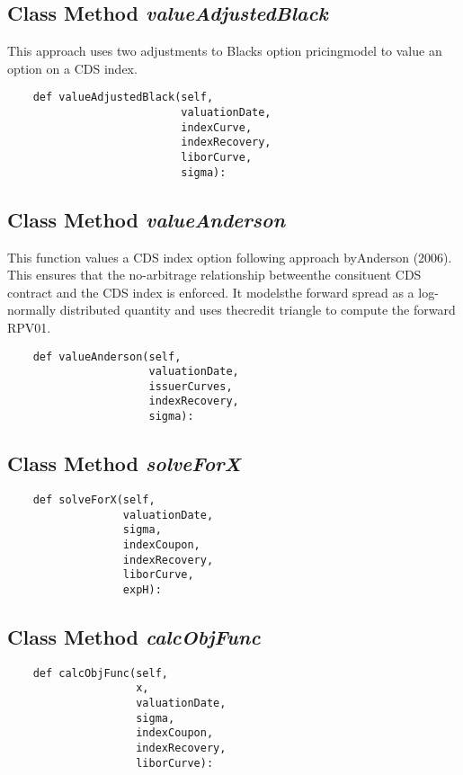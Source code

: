 \documentclass[twoside,11pt]{book}
\begin{document}
\subsection{Class Method {\it valueAdjustedBlack}}
This approach uses two adjustments to Blacks option pricingmodel to value an option on a CDS index. 

\begin{lstlisting}
    def valueAdjustedBlack(self,
                           valuationDate,
                           indexCurve,
                           indexRecovery,
                           liborCurve,
                           sigma):
\end{lstlisting}

\subsection{Class Method {\it valueAnderson}}
This function values a CDS index option following approach byAnderson (2006). This ensures that the no-arbitrage relationship betweenthe consituent CDS contract and the CDS index is enforced. It modelsthe forward spread as a log-normally distributed quantity and uses thecredit triangle to compute the forward RPV01. 

\begin{lstlisting}
    def valueAnderson(self,
                      valuationDate,
                      issuerCurves,
                      indexRecovery,
                      sigma):
\end{lstlisting}

\subsection{Class Method {\it solveForX}}


\begin{lstlisting}
    def solveForX(self,
                  valuationDate,
                  sigma,
                  indexCoupon,
                  indexRecovery,
                  liborCurve,
                  expH):
\end{lstlisting}

\subsection{Class Method {\it calcObjFunc}}


\begin{lstlisting}
    def calcObjFunc(self,
                    x,
                    valuationDate,
                    sigma,
                    indexCoupon,
                    indexRecovery,
                    liborCurve):
\end{lstlisting}
\end{document}
